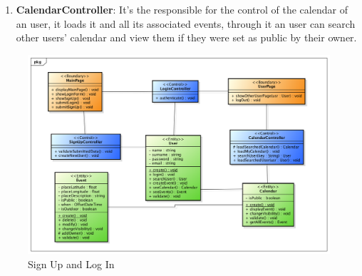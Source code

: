 \begin{itemize}
\begin{enumerate}
\item {\bf CalendarController}: It's the responsible for the control of the calendar of an user, it loads it and all its associated events, through it an user can search other users' calendar and view them if they were set as public by their owner.
\end{enumerate}
\begin{center}
 \begin{figure}[H]
    \includegraphics[width=1\textwidth]{../BCEDiagram/BCE/EntityOverview/LoginBCE.png}
    \caption{Sign Up and Log In}
     \label{fig:logBCE}
     \end{figure}
   \end{center}  
\end{itemize}

